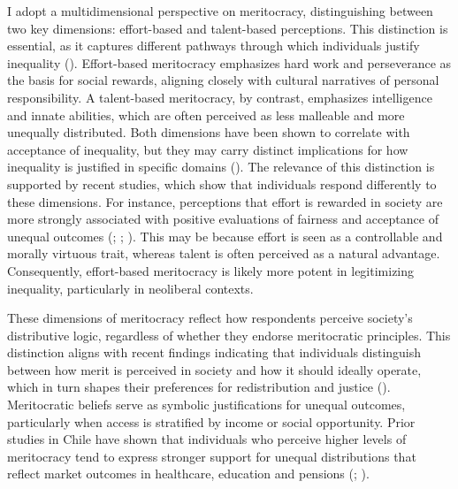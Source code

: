 \documentclass[
  13pt,
]{article}
\begin{document}
I adopt a multidimensional perspective on meritocracy, distinguishing
between two key dimensions: effort-based and talent-based perceptions.
This distinction is essential, as it captures different pathways through
which individuals justify inequality
(). Effort-based meritocracy
emphasizes hard work and perseverance as the basis for social rewards,
aligning closely with cultural narratives of personal responsibility. A
talent-based meritocracy, by contrast, emphasizes intelligence and
innate abilities, which are often perceived as less malleable and more
unequally distributed. Both dimensions have been shown to correlate with
acceptance of inequality, but they may carry distinct implications for
how inequality is justified in specific domains
().
The relevance of this distinction is supported by recent studies, which
show that individuals respond differently to these dimensions. For
instance, perceptions that effort is rewarded in society are more
strongly associated with positive evaluations of fairness and acceptance
of unequal outcomes (; ;
). This may be because
effort is seen as a controllable and morally virtuous trait, whereas
talent is often perceived as a natural advantage. Consequently,
effort-based meritocracy is likely more potent in legitimizing
inequality, particularly in neoliberal contexts.

These dimensions of meritocracy reflect how respondents perceive
society's distributive logic, regardless of whether they endorse
meritocratic principles. This distinction aligns with recent findings
indicating that individuals distinguish between how merit is perceived
in society and how it should ideally operate, which in turn shapes their
preferences for redistribution and justice
(). Meritocratic beliefs serve as symbolic justifications for
unequal outcomes, particularly when access is stratified by income or
social opportunity. Prior studies in Chile have shown that individuals
who perceive higher levels of meritocracy tend to express stronger
support for unequal distributions that reflect market outcomes in
healthcare, education and pensions
(; ).
\end{document}
